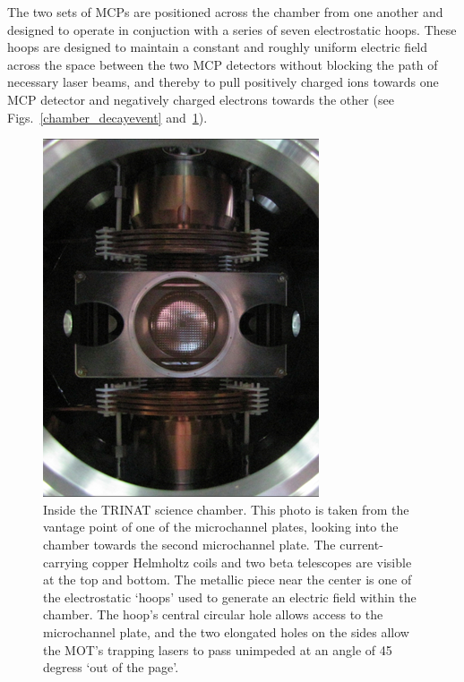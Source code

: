 The two sets of MCPs are positioned across the chamber from one another and designed to operate in conjuction with a series of seven electrostatic hoops.  These hoops are designed to maintain a constant and roughly uniform electric field across the space between the two MCP detectors without blocking the path of necessary laser beams, and thereby to pull positively charged ions towards one MCP detector and negatively charged electrons towards the other (see Figs.~\ref{chamber_decayevent} and~\ref{fig:thechamber}).  

\begin{figure}[h!!b!!t]
	\centering
	\includegraphics[width=.80\linewidth]{Figures/chamber_photo_2.png}
	\caption{Inside the TRINAT science chamber.  This photo is taken from the vantage point of one of the microchannel plates, looking into the chamber towards the second microchannel plate.  The current-carrying copper Helmholtz coils and two beta telescopes are visible at the top and bottom.  The metallic piece near the center is one of the electrostatic `hoops' used to generate an electric field within the chamber.  The hoop's central circular hole allows access to the microchannel plate, and the two elongated holes on the sides allow the MOT's trapping lasers to pass unimpeded at an angle of 45 degress `out of the page'.}
	\label{fig:thechamber}
\end{figure}


